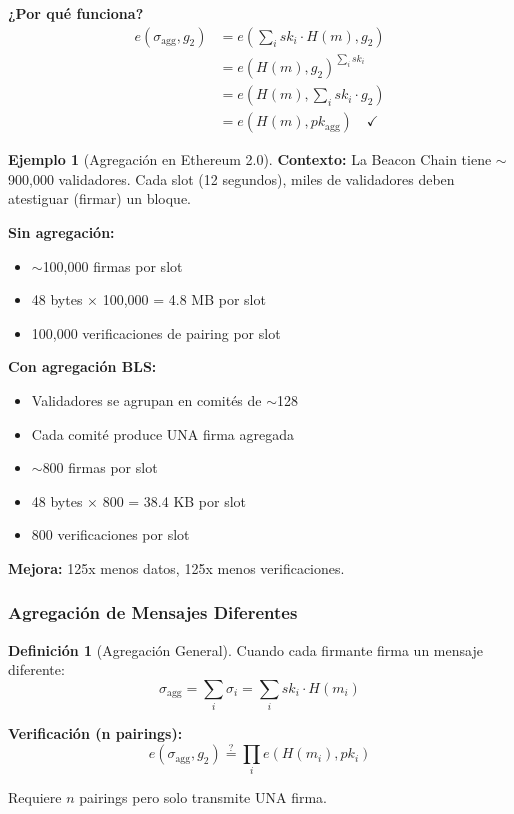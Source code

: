 \documentclass[11pt,a4paper,twoside,openright]{book}
\theoremstyle{definition}
\newtheorem{definition}{Definición}[chapter]
\newtheorem{example}{Ejemplo}[chapter]
\theoremstyle{plain}
\theoremstyle{remark}
\begin{document}
\begin{mathnote}
\textbf{¿Por qué funciona?}
\begin{align}
e(\sigma_{\text{agg}}, g_2) &= e\left(\sum_i sk_i \cdot H(m), g_2\right) \\
                            &= e\left(H(m), g_2\right)^{\sum_i sk_i} \\
                            &= e\left(H(m), \sum_i sk_i \cdot g_2\right) \\
                            &= e(H(m), pk_{\text{agg}}) \quad \checkmark
\end{align}
\end{mathnote}

\begin{example}[Agregación en Ethereum 2.0]
\textbf{Contexto:} La Beacon Chain tiene $\sim$900,000 validadores. Cada slot (12 segundos), miles de validadores deben atestiguar (firmar) un bloque.

\textbf{Sin agregación:}
\begin{itemize}
    \item $\sim$100,000 firmas por slot
    \item 48 bytes × 100,000 = 4.8 MB por slot
    \item 100,000 verificaciones de pairing por slot
\end{itemize}

\textbf{Con agregación BLS:}
\begin{itemize}
    \item Validadores se agrupan en comités de $\sim$128
    \item Cada comité produce UNA firma agregada
    \item $\sim$800 firmas por slot
    \item 48 bytes × 800 = 38.4 KB por slot
    \item 800 verificaciones por slot
\end{itemize}

\textbf{Mejora:} 125x menos datos, 125x menos verificaciones.
\end{example}

\subsubsection{Agregación de Mensajes Diferentes}

\begin{definition}[Agregación General]
Cuando cada firmante firma un mensaje diferente:
\[ \sigma_{\text{agg}} = \sum_i \sigma_i = \sum_i sk_i \cdot H(m_i) \]

\textbf{Verificación (n pairings):}
\[ e(\sigma_{\text{agg}}, g_2) \stackrel{?}{=} \prod_i e(H(m_i), pk_i) \]

Requiere $n$ pairings pero solo transmite UNA firma.
\end{definition}
\end{document}
